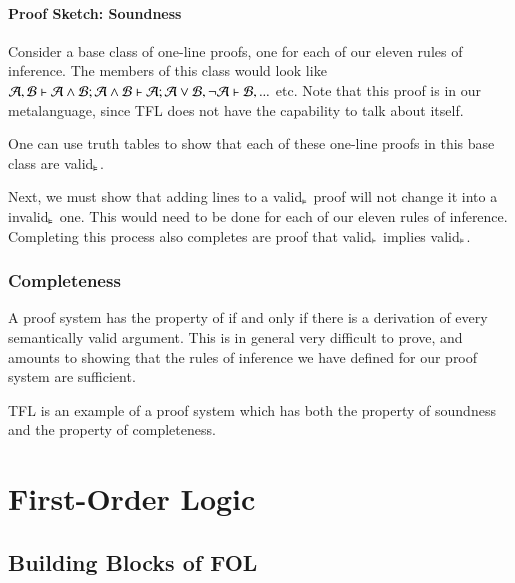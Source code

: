 \documentclass[12pt, a4paper, oneside, openright, titlepage]{book}
\begin{document}
\subsection{\textsection Proof Sketch: Soundness}


Consider a base class of one-line proofs, one for each of our eleven rules of inference. The members of this class would look like $\mathcal{A},\mathcal{B}\vdash\mathcal{A}\wedge\mathcal{B}; \mathcal{A}\wedge\mathcal{B}\vdash\mathcal{A};\mathcal{A}\vee\mathcal{B},\neg\mathcal{A}\vdash\mathcal{B},...$ etc. Note that this proof is in our metalanguage, since TFL does not have the capability to talk about itself. 

One can use truth tables to show that each of these one-line proofs in this base class are valid$_{\vDash}$.

Next, we must show that adding lines to a valid$_{\vDash}$ proof will not change it into a invalid$_{\vDash}$ one. This would need to be done for each of our eleven rules of inference. Completing this process also completes are proof that valid$_{\vdash}$ implies valid$_{\vDash}$. 


\section{\textsection Completeness}

\begin{defn}
    A proof system has the property of  if and only if there is a derivation of every semantically valid argument. This is in general very difficult to prove, and amounts to showing that the rules of inference we have defined for our proof system are sufficient.
\end{defn}

\begin{rmk}
    TFL is an example of a proof system which has both the property of soundness and the property of completeness.
\end{rmk}






\part{First-Order Logic}

\chapter{\textsection\textsection Building Blocks of FOL}
\end{document}
